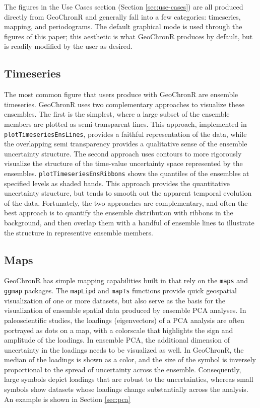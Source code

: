 \documentclass[gchron, manuscript]{copernicus}
\begin{document}
The figures in the Use Cases section (Section \ref{sec:use-cases}) are all produced directly from GeoChronR and generally fall into a few categories: timeseries, mapping, and periodograms.
The default graphical mode is used through the figures of this paper; this aesthetic is what GeoChronR produces by default, but is readily modified by the user as desired.

\subsection{Timeseries}

The most common figure that users produce with GeoChronR are ensemble timeseries.
GeoChronR uses two complementary approaches to visualize these ensembles.
The first is the simplest, where a large subset of the ensemble members are plotted as semi-transparent lines.
This approach, implemented in \texttt{plotTimeseriesEnsLines}, provides a faithful representation of the data, while the overlapping semi transparency provides a qualitative sense of the ensemble uncertainty structure.
The second approach uses contours to more rigorously visualize the structure of the time-value uncertainty space represented by the ensembles.
\texttt{plotTimeseriesEnsRibbons} shows the quantiles of the ensembles at specified levels as shaded bands.
This approach provides the quantitative uncertainty structure, but tends to smooth out the apparent temporal evolution of the data.
Fortunately, the two approaches are complementary, and often the best approach is to quantify the ensemble distribution with ribbons in the background, and then overlap them with a handful of ensemble lines to illustrate the structure in representive ensemble members.

\subsection{Maps}

GeoChronR has simple mapping capabilities built in that rely on the \texttt{maps} \citep{maps} and \texttt{ggmap} \citep{ggmap} packages.
The \texttt{mapLipd} and \texttt{mapTs} functions provide quick geospatial visualization of one or more datasets, but also serve as the basis for the visualization of ensemble spatial data produced by ensemble PCA analyses.
In paleoscientific studies, the loadings (eigenvectors) of a PCA analysis are often portrayed as dots on a map, with a colorscale that highlights the sign and amplitude of the loadings.
In ensemble PCA, the additional dimension of uncertainty in the loadings needs to be visualized as well.
In GeoChronR, the median of the loadings is shown as a color, and the size of the symbol is inversely proportional to the spread of uncertainty across the ensemble.
Consequently, large symbols depict loadings that are robust to the uncertainties, whereas small symbols show datasets whose loadings change substantially across the analysis.
An example is shown in Section \ref{sec:pca}
\end{document}
